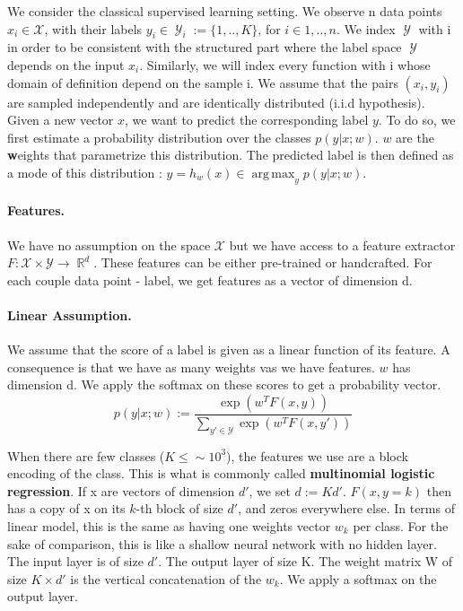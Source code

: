 \documentclass{article}
\DeclareMathOperator{\R}{\mathbb{R}}
\DeclareMathOperator{\1}{\mathbb{1}}
\DeclareMathOperator{\Y}{\mathcal{Y}}
\DeclareMathOperator*{\argmax}{arg\,max}
\begin{document}
We consider the classical supervised learning setting.
We observe n data points $x_i \in \mathcal{X}$, with their labels $y_i\in \Y_i:= \{1,..,K\}$, for $i \in {1,..,n}$.
We index $\Y$ with i in order to be consistent with the structured part where the label space $\Y$ depends on the input $x_i$.
Similarly, we will index every function with i  whose domain of definition depend on the sample i.
We assume that the pairs $(x_i, y_i)$ are sampled independently and are identically distributed (i.i.d hypothesis).
Given a new vector $x$, we want to predict the corresponding label $y$. 
To do so, we first estimate a probability distribution over the classes $p(y|x ; w)$.
$w$ are the \textbf{w}eights that parametrize this distribution. 
The predicted label is then defined as a mode of this distribution : $\hat y = h_w(x) \in \argmax_y p(y| x ; w)$.

\paragraph{Features.}
We have no assumption on the space $\mathcal X$ but we have access to a feature extractor $F:\mathcal X \times \mathcal Y \rightarrow \R^d$.
These features can be either pre-trained or handcrafted.
For each couple data point - label, we get features as a vector of dimension d.

\paragraph{Linear Assumption.}
We assume that the score of a label is given as a linear function of its feature.
A consequence is that we have as many weights vas we have  features.
$w$ has dimension d.
We apply the softmax on these scores to get a probability vector. 
\begin{equation}
	\label{primal probability}
	p(y | x ; w) := \frac{\exp(w^TF(x, y))}{\sum_{y' \in \mathcal{Y}} \exp(w^TF(x, y'))}
\end{equation}

When there are few classes ($K \leq \sim 10^3$), the features we use are a block encoding of the class.
This is what is commonly called \textbf{multinomial logistic regression}.
If x are vectors of dimension $d'$, we set $d:=Kd'$. $F(x, y=k)$ then has a copy of x on its $k$-th block of size $d'$, and zeros everywhere else.
In terms of linear model, this is the same as having one weights vector $w_k$ per class.
For the sake of comparison, this is like a shallow neural network with no hidden layer.
The input layer is of size $d'$.
The output layer of size K.
The weight matrix W of size $K \times d'$ is the vertical concatenation of the $w_k$.
We apply a softmax on the output layer.
\end{document}
